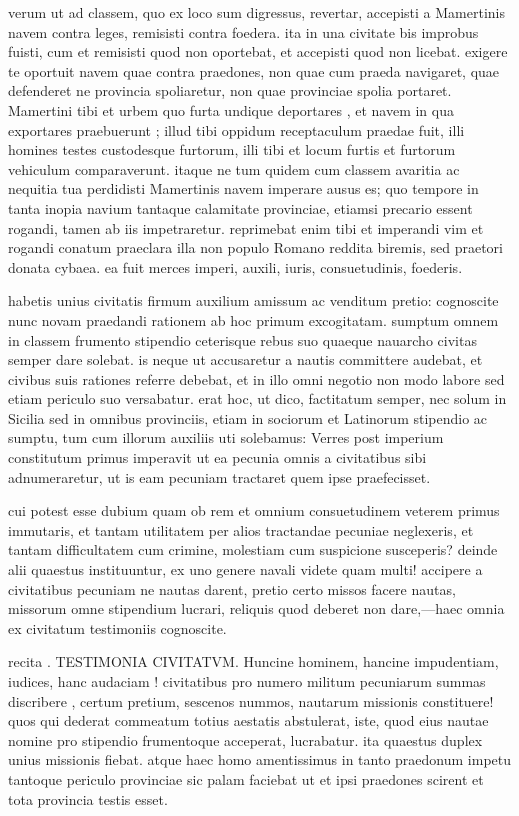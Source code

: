  verum ut ad classem, quo ex loco sum digressus, revertar, accepisti a Mamertinis navem contra leges, remisisti contra foedera. ita in una civitate bis improbus fuisti, cum et remisisti quod non oportebat, et accepisti quod non licebat. exigere te oportuit navem quae contra praedones, non quae cum praeda navigaret, quae defenderet ne provincia spoliaretur, non quae provinciae spolia portaret. Mamertini tibi et urbem quo furta undique deportares , et navem in qua exportares praebuerunt ; illud tibi oppidum receptaculum praedae fuit, illi homines testes custodesque furtorum, illi tibi et locum furtis et furtorum vehiculum comparaverunt. itaque ne tum quidem cum classem avaritia ac nequitia tua perdidisti Mamertinis navem imperare ausus es; quo tempore in tanta inopia navium tantaque calamitate provinciae, etiamsi precario essent rogandi, tamen ab iis impetraretur. reprimebat enim tibi et imperandi vim et rogandi conatum praeclara illa non populo Romano reddita biremis, sed praetori donata cybaea. ea fuit merces imperi, auxili, iuris, consuetudinis, foederis.

 habetis unius civitatis firmum auxilium amissum ac venditum pretio: cognoscite nunc novam praedandi rationem ab hoc primum excogitatam. sumptum omnem in classem frumento stipendio ceterisque rebus suo quaeque nauarcho civitas semper dare solebat. is neque ut accusaretur a nautis committere audebat, et civibus suis rationes referre debebat, et in illo omni negotio non modo labore sed etiam periculo suo versabatur. erat hoc, ut dico, factitatum semper, nec solum in Sicilia sed in omnibus provinciis, etiam in sociorum et Latinorum stipendio ac sumptu, tum cum illorum auxiliis uti solebamus: Verres post imperium constitutum primus imperavit ut ea pecunia omnis a civitatibus sibi adnumeraretur, ut is eam pecuniam tractaret quem ipse praefecisset.

 cui potest esse dubium quam ob rem et omnium consuetudinem veterem primus immutaris, et tantam utilitatem per alios tractandae pecuniae neglexeris, et tantam difficultatem cum crimine, molestiam cum suspicione susceperis? deinde alii quaestus instituuntur, ex uno genere navali videte quam multi! accipere a civitatibus pecuniam ne nautas darent, pretio certo missos facere nautas, missorum omne stipendium lucrari, reliquis quod deberet non dare,—haec omnia ex civitatum testimoniis cognoscite.

 recita . TESTIMONIA CIVITATVM. Huncine hominem, hancine impudentiam, iudices, hanc audaciam ! civitatibus pro numero militum pecuniarum summas discribere , certum pretium, sescenos nummos, nautarum missionis constituere! quos qui dederat commeatum totius aestatis abstulerat, iste, quod eius nautae nomine pro stipendio frumentoque acceperat, lucrabatur. ita quaestus duplex unius missionis fiebat. atque haec homo amentissimus in tanto praedonum impetu tantoque periculo provinciae sic palam faciebat ut et ipsi praedones scirent et tota provincia testis esset.

